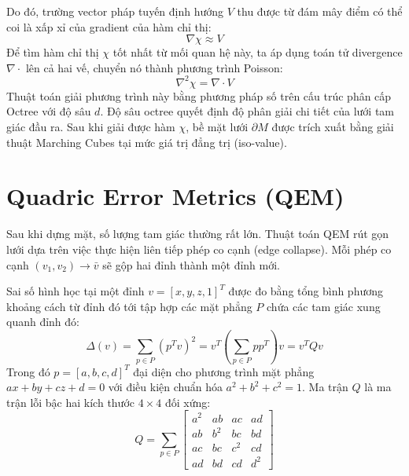 \documentclass[a4paper,12pt]{report}
\begin{document}
Do đó, trường vector pháp tuyến định hướng $V$ thu được từ đám mây điểm có thể coi là xấp xỉ của gradient của hàm chỉ thị:
\begin{equation}
    \nabla \chi \approx V
\end{equation}
Để tìm hàm chỉ thị $\chi$ tốt nhất từ mối quan hệ này, ta áp dụng toán tử divergence $\nabla \cdot$ lên cả hai vế, chuyển nó thành phương trình Poisson:
\begin{equation}
    \nabla^2 \chi = \nabla \cdot V
\end{equation}
Thuật toán giải phương trình này bằng phương pháp số trên cấu trúc phân cấp Octree với độ sâu $d$. Độ sâu octree quyết định độ phân giải chi tiết của lưới tam giác đầu ra. Sau khi giải được hàm $\chi$, bề mặt lưới $\partial M$ được trích xuất bằng giải thuật Marching Cubes tại mức giá trị đẳng trị (iso-value).

\section{Quadric Error Metrics (QEM)}
Sau khi dựng mặt, số lượng tam giác thường rất lớn. Thuật toán QEM rút gọn lưới dựa trên việc thực hiện liên tiếp phép co cạnh (edge collapse). Mỗi phép co cạnh $(v_1, v_2) \rightarrow \bar{v}$ sẽ gộp hai đỉnh thành một đỉnh mới.

Sai số hình học tại một đỉnh $v = [x, y, z, 1]^T$ được đo bằng tổng bình phương khoảng cách từ đỉnh đó tới tập hợp các mặt phẳng $P$ chứa các tam giác xung quanh đỉnh đó:
\begin{equation}
    \Delta(v) = \sum_{p \in P} (p^T v)^2 = v^T \left( \sum_{p \in P} p p^T \right) v = v^T Q v
\end{equation}
Trong đó $p = [a, b, c, d]^T$ đại diện cho phương trình mặt phẳng $ax + by + cz + d = 0$ với điều kiện chuẩn hóa $a^2 + b^2 + c^2 = 1$. Ma trận $Q$ là ma trận lỗi bậc hai kích thước $4 \times 4$ đối xứng:
\begin{equation}
    Q = \sum_{p \in P} \begin{bmatrix}
    a^2 & ab & ac & ad \\
    ab & b^2 & bc & bd \\
    ac & bc & c^2 & cd \\
    ad & bd & cd & d^2
    \end{bmatrix}
\end{equation}
\end{document}
